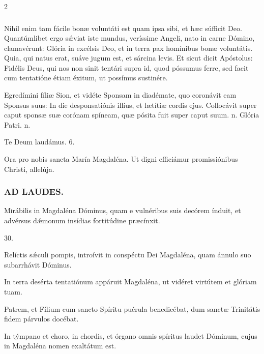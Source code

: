 \documentclass[9pt,twoside]{extarticle}
\begin{document}
\begin{multicols}{2}
\subsubsection*{\center {}}
Nihil enim tam fácile bonæ voluntáti est quam ipsa sibi, et hæc súfficit Deo. Quantúmlibet ergo sǽviat iste mundus, veríssime Angeli, nato in carne Dómino, clamavérunt: Glória in excélsis Deo, et in terra pax homínibus bonæ voluntátis. Quia, qui natus erat, suáve jugum est, et sárcina levis. Et sicut dicit Apóstolus: Fidélis Deus, qui nos non sinit tentári supra id, quod póssumus ferre, sed facit cum tentatióne étiam éxitum, ut possímus sustinére.

\begin{tightlist}{}
\item {} Egredímini fíliæ Sion, et vidéte Sponsam in diadémate, quo coronávit eam Sponsus suus: \textred{*} In die desponsatiónis illíus, et lætítiæ cordis ejus.  Collocávit super caput sponsæ suæ corónam spíneam, quæ pósita fuit super caput suum. n. Glória Patri. n.
\item Te Deum laudámus. 6.
\item {} Ora pro nobis sancta María Magdaléna.  Ut digni efficiámur promissiónibus Christi, allelúja.
\end{tightlist}

\subsubsection*{\center \textsc{AD LAUDES.}}
\begin{center}\end{center}
\lettrine{M}irábilis in Magdaléna Dóminus, quam e vulnéribus suis decórem índuit, et advérsus dǽmonum insídias fortitúdine præcínxit.

\begin{tightlist}{}
\item {} 30.
\item {} Relíctis sǽculi pompis, introívit in conspéctu Dei Magdaléna, quam ánnulo suo subarrhávit Dóminus.
\item {} In terra desérta tentatiónum appáruit Magdaléna, ut vidéret virtútem et glóriam tuam.
\item {} Patrem, et Fílium cum sancto Spíritu puérula benedicébat, dum sanctæ Trinitátis fidem párvulos docébat.
\item {} In týmpano et choro, in chordis, et órgano omnis spíritus laudet Dóminum, cujus in Magdaléna nomen exaltátum est.
\end{tightlist}


\end{multicols}
\end{document}
